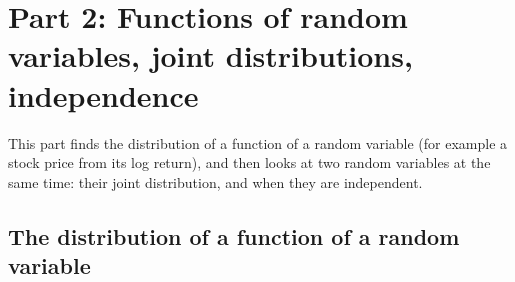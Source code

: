 \clearpage
\section{Part 2: Functions of random variables, joint distributions,
	independence}

This part finds the distribution of a function of a random variable (for
example a stock price from its log return), and then looks at two random
variables at the same time: their joint distribution, and when they are
independent.

\subsection*{The distribution of a function of a random variable}

